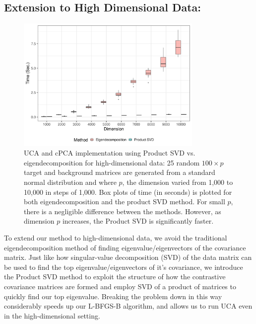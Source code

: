 \documentclass[12pt]{article}
\begin{document}
\subsection{Extension to High Dimensional Data:}
\begin{figure}[!ht]
  \centering
  \includegraphics[width = 0.8\textwidth]{figure/final_perf.png}
  \caption{UCA and cPCA implementation using Product SVD vs. eigendecomposition for high-dimensional data: 25 random $100 \times p $ target and background matrices are generated from a standard normal distribution and where $p$, the dimension varied from 1,000 to 10,000 in steps of 1,000. Box plots of time (in seconds) is plotted for both eigendecomposition and the product SVD method. For small $p$, there is a negligible difference between the methods. However, as dimension $p$ increases, the Product SVD is significantly faster.}
  \label{fig:computational_perf}
\end{figure}

To extend our method to high-dimensional data, we avoid the traditional eigendecomposition method of finding eigenvalue/eigenvectors of the covariance matrix. Just like how singular-value decomposition (SVD) of the data matrix can be used to find the top eigenvalue/eigenvectors of it's covariance, we introduce the Product SVD method to exploit the structure of how the contrastive covariance matrices are formed and employ SVD of a product of matrices to quickly find our top eigenvalue.  Breaking the problem down in this way considerably speeds up our L-BFGS-B algorithm, and allows us to run UCA even in the high-dimensional setting.
\end{document}
